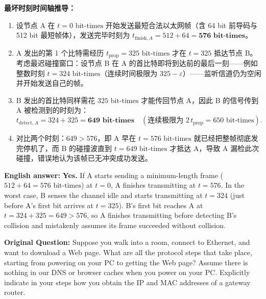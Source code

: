 \textbf{最坏时刻时间轴推导：}
\begin{enumerate}
\item 设节点 A 在 $t = 0\text{ bit-times}$ 开始发送最短合法以太网帧（含 64 bit 前导码与 512 bit 最短帧体），发送完毕时刻为 $t_{\mathrm{finish}, A} = 512 + 64 = \mathbf{576\text{ bit-times}}$。
\item A 发出的第 1 个比特需经历 $t_{\mathrm{prop}} = 325\text{ bit-times}$ 才在 $t = 325$ 抵达节点 B。考虑最迟碰撞窗口：设节点 B 在 A 的首比特即将到达前的最后一刻——例如整数时刻 $t = 324\text{ bit-times}$（连续时间极限为 $325 - \varepsilon$）——监听信道仍为空闲并开始发送自己的帧。
\item B 发出的首比特同样需花 $325\text{ bit-times}$ 才能传回节点 A，因此 B 的信号传到 A 被检测到的时刻为：
\[
t_{\mathrm{detect}, A} = 324 + 325 = \mathbf{649\text{ bit-times}} \quad (\text{连续极限为 } 2\,t_{\mathrm{prop}} = 650\text{ bit-times}).
\tag{A3.1}
\]
\item 对比两个时刻：$649 > 576$，即 A 早在 $t = 576\text{ bit-times}$ 就已经把整帧彻底发完停机了，而 B 的碰撞波直到 $t = 649\text{ bit-times}$ 才抵达 A，导致 A 漏检此次碰撞，错误地认为该帧已无冲突成功发送。
\end{enumerate}

\textbf{English answer:} \textbf{Yes.} If A starts sending a minimum-length frame ($512+64 = 576\text{ bit-times}$) at $t=0$, A finishes transmitting at $t=576$. In the worst case, B senses the channel idle and starts transmitting at $t=324$ (just before A's first bit arrives at $t=325$). B's first bit reaches A at $t = 324 + 325 = 649 > 576$, so A finishes transmitting before detecting B's collision and mistakenly assumes its frame succeeded without collision.



\textbf{Original Question:} Suppose you walk into a room, connect to Ethernet, and want to download a Web page. What are all the protocol steps that take place, starting from powering on your PC to getting the Web page? Assume there is nothing in our DNS or browser caches when you power on your PC. Explicitly indicate in your steps how you obtain the IP and MAC addresses of a gateway router.

